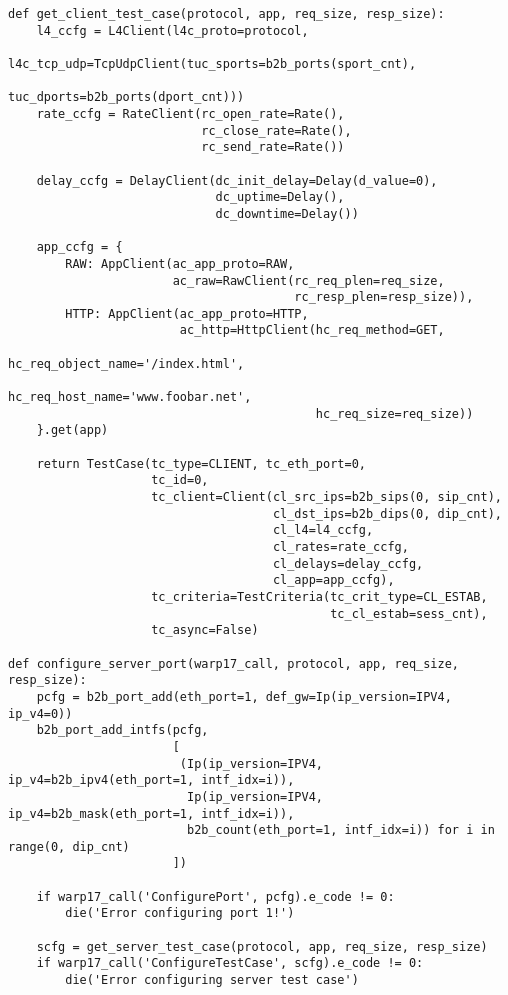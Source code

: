\begin{landscape}
\begin{verbatim}
def get_client_test_case(protocol, app, req_size, resp_size):
    l4_ccfg = L4Client(l4c_proto=protocol,
                       l4c_tcp_udp=TcpUdpClient(tuc_sports=b2b_ports(sport_cnt),
                                                tuc_dports=b2b_ports(dport_cnt)))
    rate_ccfg = RateClient(rc_open_rate=Rate(),
                           rc_close_rate=Rate(),
                           rc_send_rate=Rate())

    delay_ccfg = DelayClient(dc_init_delay=Delay(d_value=0),
                             dc_uptime=Delay(),
                             dc_downtime=Delay())

    app_ccfg = {
        RAW: AppClient(ac_app_proto=RAW,
                       ac_raw=RawClient(rc_req_plen=req_size,
                                        rc_resp_plen=resp_size)),
        HTTP: AppClient(ac_app_proto=HTTP,
                        ac_http=HttpClient(hc_req_method=GET,
                                           hc_req_object_name='/index.html',
                                           hc_req_host_name='www.foobar.net',
                                           hc_req_size=req_size))
    }.get(app)

    return TestCase(tc_type=CLIENT, tc_eth_port=0,
                    tc_id=0,
                    tc_client=Client(cl_src_ips=b2b_sips(0, sip_cnt),
                                     cl_dst_ips=b2b_dips(0, dip_cnt),
                                     cl_l4=l4_ccfg,
                                     cl_rates=rate_ccfg,
                                     cl_delays=delay_ccfg,
                                     cl_app=app_ccfg),
                    tc_criteria=TestCriteria(tc_crit_type=CL_ESTAB,
                                             tc_cl_estab=sess_cnt),
                    tc_async=False)

def configure_server_port(warp17_call, protocol, app, req_size, resp_size):
    pcfg = b2b_port_add(eth_port=1, def_gw=Ip(ip_version=IPV4, ip_v4=0))
    b2b_port_add_intfs(pcfg,
                       [
                        (Ip(ip_version=IPV4, ip_v4=b2b_ipv4(eth_port=1, intf_idx=i)),
                         Ip(ip_version=IPV4, ip_v4=b2b_mask(eth_port=1, intf_idx=i)),
                         b2b_count(eth_port=1, intf_idx=i)) for i in range(0, dip_cnt)
                       ])

    if warp17_call('ConfigurePort', pcfg).e_code != 0:
        die('Error configuring port 1!')

    scfg = get_server_test_case(protocol, app, req_size, resp_size)
    if warp17_call('ConfigureTestCase', scfg).e_code != 0:
        die('Error configuring server test case')


\end{verbatim}
\end{landscape}

